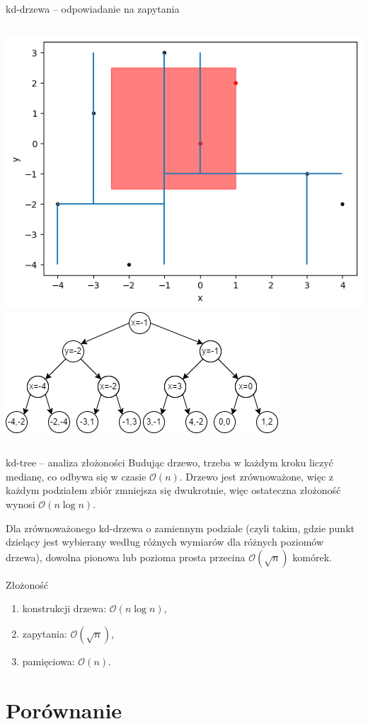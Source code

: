 \documentclass[aspectratio=169,dvipsnames]{beamer}
\newcommand{\sO}{\mathcal O}
\begin{document}
\begin{frame}{kd-drzewa -- odpowiadanie na zapytania}
    \begin{columns}
        \includegraphics[width=\textwidth]{images/plots/9}
        \includegraphics[width=\textwidth]{images/trees/12.drawio}
    \end{columns}
\end{frame}


\begin{frame}{kd-tree -- analiza złożoności}
    Budując drzewo, trzeba w każdym kroku liczyć medianę, co odbywa się w czasie $\sO(n)$.
    Drzewo jest zrównoważone, więc z każdym podziałem zbiór zmniejsza się dwukrotnie,
    więc ostateczna złożoność wynosi $\sO(n \log n)$.

    \pause
    \begin{lemma}[o kd-drzewie]
        Dla zrównoważonego kd-drzewa o zamiennym podziale (czyli takim, gdzie punkt dzielący jest wybierany według różnych wymiarów dla różnych poziomów drzewa), dowolna pionowa lub pozioma prosta przecina $\sO(\sqrt n)$ komórek.
    \end{lemma}

    Złożoność
    \begin{enumerate}
        \item konstrukcji drzewa: $\sO(n\log n)$,
        \item zapytania: $\sO(\sqrt n)$,
        \item pamięciowa: $\sO(n)$.
    \end{enumerate}
\end{frame}

\section{Porównanie}
\end{document}
